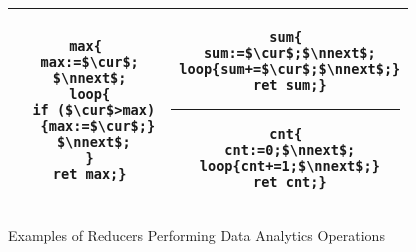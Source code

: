 \begin{figure}
	\centering
	\lstset{language=C,
		basicstyle=\ttfamily\scriptsize}
	\begin{tabular}{|c|c|}
		\hline
		\begin{minipage}[t]{0.4\textwidth}
		\vspace{-0.5cm}
			\begin{lstlisting}[mathescape=true]
max{
 max:=$\cur$;
 $\nnext$;
 loop{
  if ($\cur$>max)
   {max:=$\cur$;}
  $\nnext$;
 }
 ret max;}
	\end{lstlisting}
		\end{minipage}&
		\begin{minipage}[t]{0.4\textwidth}
		\vspace{-0.5cm}
			\begin{lstlisting}[mathescape=true]
sum{
 sum:=$\cur$;$\nnext$;
 loop{sum+=$\cur$;$\nnext$;}
 ret sum;}
			\end{lstlisting}
\hrule\vspace{0.1cm}%
			\begin{lstlisting}[mathescape=true]
cnt{
 cnt:=0;$\nnext$;
 loop{cnt+=1;$\nnext$;}
 ret cnt;}
			\end{lstlisting}			
		\end{minipage}\\
		\hline		
	\end{tabular}
	\caption{Examples of Reducers Performing Data Analytics Operations}
	\label{fig:examples}
\end{figure}
